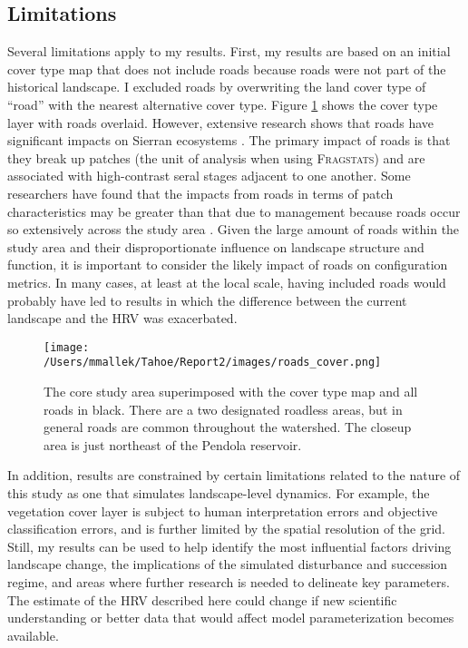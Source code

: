 \subsection{Limitations}
Several limitations apply to my results. First, my results are based on an initial cover type map that does not include roads because roads were not part of the historical landscape. I excluded roads by overwriting the land cover type of ``road'' with the nearest alternative cover type. Figure \ref{fig:roadcovermap} shows the cover type layer with roads overlaid. However, extensive research shows that roads have significant impacts on Sierran ecosystems \citep{Trombulak2000,Gucinski2001,Karr2004,Theobald2011}. The primary impact of roads is that they break up patches (the unit of analysis when using \textsc{Fragstats}) and are associated with high-contrast seral stages adjacent to one another. Some researchers have found that the impacts from roads in terms of patch characteristics may be greater than that due to management because roads occur so extensively across the study area \citep{Tinker1998,Gucinski2001,Mcgarigal2001}. Given the large amount of roads within the study area and their disproportionate influence on landscape structure and function, it is important to consider the likely impact of roads on configuration metrics. In many cases, at least at the local scale, having included roads would probably have led to results in which the difference between the current landscape and the HRV was exacerbated.
%
\begin{figure}[!htbp]
  \centering
  \texttt{[image: /Users/mmallek/Tahoe/Report2/images/roads\_cover.png]}
  \caption{The core study area superimposed with the cover type map and all roads in black. There are a two designated roadless areas, but in general roads are common throughout the watershed. The closeup area is just northeast of the Pendola reservoir.} 
  \label{fig:roadcovermap}
\end{figure}
%

In addition, results are constrained by certain limitations related to the nature of this study as one that simulates landscape-level dynamics. For example, the vegetation cover layer is subject to human interpretation errors and objective classification errors, and is further limited by the spatial resolution of the grid. Still, my results can be used to help identify the most influential factors driving landscape change, the implications of the simulated disturbance and succession regime, and areas where further research is needed to delineate key parameters. The estimate of the HRV described here could change if new scientific understanding or better data that would affect model parameterization becomes available.


